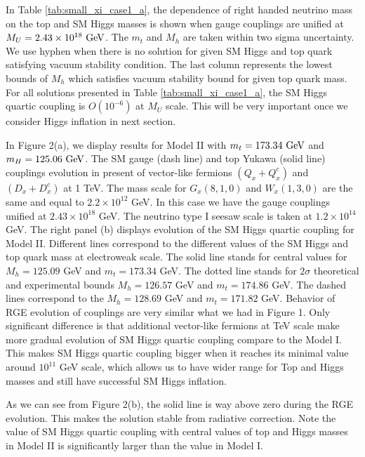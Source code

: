 \documentclass[aps,prd,preprint,superscriptaddress,showpacs,ctexart]{revtex4-1}
\begin{document}
In Table \ref{tab:small_xi_case1_a}, the dependence of right handed neutrino mass on the top and SM Higgs masses is shown when gauge couplings are unified at $M_{U}=2.43\times10^{18}~{\rm GeV}$. The $m_{t}$ and $M_{h}$ are taken within two sigma uncertainty. We use hyphen when there is no solution for given SM Higgs and top quark satisfying vacuum stability condition. The last column represents  the lowest bounds of $M_{h}$ which satisfies vacuum stability bound for given top quark mass. For all solutions presented in Table \ref{tab:small_xi_case1_a}, the SM Higgs quartic coupling is $O(10^{-6})$ at $M_U$ scale. This will be very important once we consider Higgs inflation in next section.

In Figure 2(a), we display results for Model II with $m_{t}=173.34{\rm ~GeV}$
and $m_{H}=125.06{\rm ~GeV}$. The SM gauge (dash line) and top Yukawa
(solid line) couplings evolution in present of vector-like fermions
$(Q_{x}+Q_{x}^{c})$ and $(D_{x}+D_{x}^{c})$ at 1 TeV. The mass scale
for $G_{x}(8,1,0)$ and $W_{x}(1,3,0)$ are the same and equal to
$2.2\times10^{12}$ GeV. In this case we have the gauge couplings unified
at $2.43\times10^{18}$ GeV. The neutrino type I seesaw scale is taken
at $1.2\times10^{14}$ GeV. The right panel (b) displays evolution
of the SM Higgs quartic coupling for Model II. Different lines correspond
to the different values of the SM Higgs and top quark mass at electroweak
scale. The solid line stands for central values for $M_{h}=125.09$
GeV and $m_{t}=173.34$ GeV. The dotted line stands for $2\sigma$
theoretical and experimental bounds \cite{Patrignani:2016xqp} $M_{h}=126.57$
GeV and $m_{t}=174.86$ GeV. The dashed lines correspond to the $M_{h}=128.69$
GeV and $m_{t}=171.82$ GeV. Behavior of RGE evolution of couplings are very similar what we had in Figure 1. Only significant difference is that additional vector-like
fermions at TeV scale make more gradual evolution of SM Higgs quartic
coupling compare to the Model I. This makes SM Higgs quartic coupling
bigger when it reaches its minimal value around $10^{11}$ GeV scale,
which allows us to have wider range for Top and Higgs masses and still
have successful SM Higgs inflation.

As we can see from Figure 2(b), the solid line is way above zero during the RGE evolution.
This makes the solution stable from radiative correction. Note the value of SM Higgs quartic coupling
with central values of top and Higgs masses in Model II is significantly larger than the value in Model I. 
\end{document}
